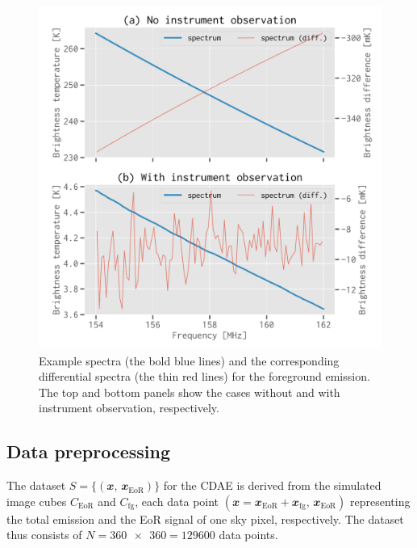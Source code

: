 \documentclass[fleqn,usenatbib]{mnras}
\newlength{\myfigwidth}
\newcommand{\R}[1]{\mathrm{#1}}
\newcommand{\B}[1]{\mathbfit{#1}}
\begin{document}
\begin{figure}
  \centering
  \includegraphics[width=\myfigwidth]{simudata}
  \caption{\label{fig:simudata}%
    Example spectra (the bold blue lines) and the corresponding
    differential spectra (the thin red lines) for the foreground
    emission.
    The top and bottom panels show the cases without and with
    instrument observation, respectively.
  }
\end{figure}


\subsection{Data preprocessing}
\label{sec:preprocessing}

The dataset $S = \{(\B{x}, \,\B{x}_{\R{EoR}})\}$ for the CDAE is derived
from the simulated image cubes $C_{\R{EoR}}$ and $C_{\R{fg}}$, each data
point $(\B{x} = \B{x}_{\R{EoR}} + \B{x}_{\R{fg}}, \,\B{x}_{\R{EoR}})$
representing the total emission and the EoR signal of one sky pixel,
respectively.
The dataset thus consists of $N = \num{360x360} = \num{129600}$ data points.
\end{document}
